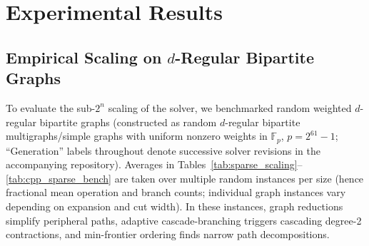 \documentclass[11pt,a4paper]{article}
\theoremstyle{definition}
\newcommand{\F}{\mathbb{F}}
\begin{document}
\section{Experimental Results}

\subsection{Empirical Scaling on $d$-Regular Bipartite Graphs}

To evaluate the sub-$2^n$ scaling of the solver, we benchmarked random weighted $d$-regular bipartite graphs (constructed as random $d$-regular bipartite multigraphs/simple graphs with uniform nonzero weights in $\F_p$, $p = 2^{61}-1$; ``Generation'' labels throughout denote successive solver revisions in the accompanying repository). Averages in Tables~\ref{tab:sparse_scaling}--\ref{tab:cpp_sparse_bench} are taken over multiple random instances per size (hence fractional mean operation and branch counts; individual graph instances vary depending on expansion and cut width). In these instances, graph reductions simplify peripheral paths, adaptive cascade-branching triggers cascading degree-2 contractions, and min-frontier ordering finds narrow path decompositions.

\begin{table}[!htbp]
\centering
\caption{Empirical complexity and wall-clock execution time of \texttt{sparse\_permanent.py} (Generation 11) vs.\ dense $2^n$ subset iterations across regular bipartite graphs.}
\label{tab:sparse_scaling}
\end{table}
\end{document}
